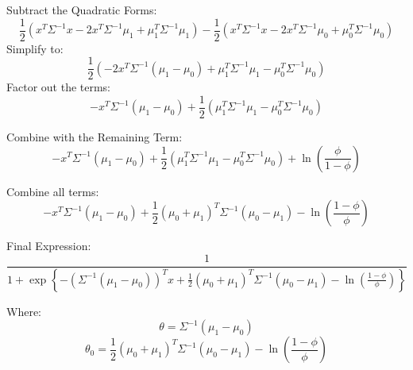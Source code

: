 \begin{answer}
Subtract the Quadratic Forms:
\[
\frac{1}{2} \left( x^T \Sigma^{-1} x - 2 x^T \Sigma^{-1} \mu_1 + \mu_1^T \Sigma^{-1} \mu_1 \right) - \frac{1}{2} \left( x^T \Sigma^{-1} x - 2 x^T \Sigma^{-1} \mu_0 + \mu_0^T \Sigma^{-1} \mu_0 \right)
\]
Simplify to:
\[
\frac{1}{2} \left( - 2 x^T \Sigma^{-1} (\mu_1 - \mu_0) + \mu_1^T \Sigma^{-1} \mu_1 - \mu_0^T \Sigma^{-1} \mu_0 \right)
\]
Factor out the terms:
\[
- x^T \Sigma^{-1} (\mu_1 - \mu_0) + \frac{1}{2} (\mu_1^T \Sigma^{-1} \mu_1 - \mu_0^T \Sigma^{-1} \mu_0)
\]

Combine with the Remaining Term:
\[
- x^T \Sigma^{-1} (\mu_1 - \mu_0) + \frac{1}{2} (\mu_1^T \Sigma^{-1} \mu_1 - \mu_0^T \Sigma^{-1} \mu_0) + \ln \left( \frac{\phi}{1 - \phi} \right)
\]

Combine all terms:
\[
- x^T \Sigma^{-1} (\mu_1 - \mu_0) + \frac{1}{2} (\mu_0 + \mu_1)^T \Sigma^{-1} (\mu_0 - \mu_1) - \ln \left( \frac{1 - \phi}{\phi} \right)
\]

Final Expression:
\[
\frac{1}{1 + \exp \left\{ - \left( \Sigma^{-1} (\mu_1 - \mu_0) \right)^T x + \frac{1}{2} (\mu_0 + \mu_1)^T \Sigma^{-1} (\mu_0 - \mu_1) - \ln \left( \frac{1 - \phi}{\phi} \right) \right\} }
\]

Where: 
\[
\theta = \Sigma^{-1} (\mu_1 - \mu_0)
\]
\[
\theta_0 = \frac{1}{2} (\mu_0 + \mu_1)^T \Sigma^{-1} (\mu_0 - \mu_1) - \ln \left( \frac{1 - \phi}{\phi} \right)
\]




\end{answer}
